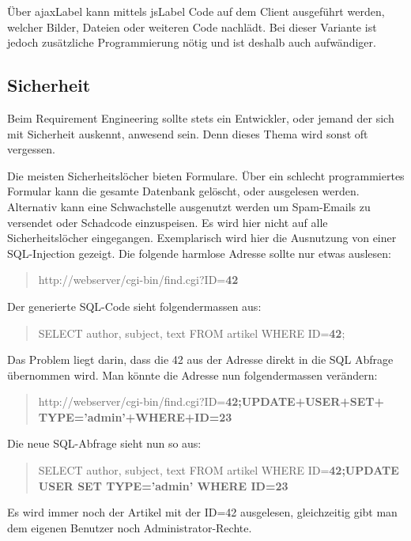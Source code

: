 Über \gls{ajaxLabel} kann mittels \gls{jsLabel} Code auf dem Client ausgeführt werden, welcher Bilder, Dateien oder weiteren Code nachlädt. Bei dieser Variante ist jedoch zusätzliche Programmierung nötig und ist deshalb auch aufwändiger. 

\subsection{Sicherheit}
Beim Requirement Engineering sollte stets ein Entwickler, oder jemand der sich mit Sicherheit auskennt, anwesend sein. Denn dieses Thema wird sonst oft vergessen.

Die meisten Sicherheitslöcher bieten Formulare. Über ein schlecht programmiertes Formular kann die gesamte Datenbank gelöscht, oder ausgelesen werden. Alternativ kann eine Schwachstelle ausgenutzt werden um Spam-Emails zu versendet oder Schadcode einzuspeisen.
Es wird hier nicht auf alle Sicherheitslöcher eingegangen. Exemplarisch wird hier die Ausnutzung von einer SQL-Injection gezeigt. Die folgende harmlose Adresse sollte nur etwas auslesen:

\begin{quote}
http://webserver/cgi-bin/find.cgi?ID=\textbf{42}
\end{quote}

Der generierte SQL-Code sieht folgendermassen aus:

\begin{quote}
SELECT author, subject, text FROM artikel WHERE ID=\textbf{42};
\end{quote}

Das Problem liegt darin, dass die 42 aus der Adresse direkt in die SQL Abfrage übernommen wird. Man könnte die Adresse nun folgendermassen verändern:

\begin{quote}
http://webserver/cgi-bin/find.cgi?ID=\textbf{42;UPDATE+USER+SET+\\
TYPE='admin'+WHERE+ID=23}
\end{quote}

Die neue SQL-Abfrage sieht nun so aus:


\begin{quote}
SELECT author, subject, text FROM artikel WHERE ID=\textbf{42;UPDATE USER SET TYPE='admin' WHERE ID=23}
\end{quote}

Es wird immer noch der Artikel mit der ID=42 ausgelesen, gleichzeitig gibt man dem eigenen Benutzer noch Administrator-Rechte.

